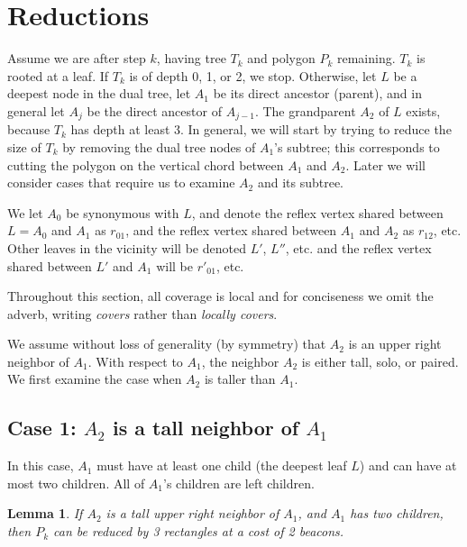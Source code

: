 \documentclass{article}
\newtheorem{lemma}{Lemma}
\begin{document}
\section{Reductions}\label{sec:reductions}

	Assume we are after step $k$, having tree $T_k$ and polygon $P_k$ remaining.
	$T_k$ is rooted at a leaf.
	If $T_k$ is of depth 0, 1, or 2, we stop.
	Otherwise, let $L$ be a deepest node in the dual
	tree, let $A_1$ be its direct ancestor (parent),
	and in general let $A_j$ be the direct ancestor of $A_{j-1}$.
	The grandparent $A_2$ of $L$ exists,
	because $T_k$ has depth at least 3.
	In general, we will start by trying to reduce the size of $T_k$
	by removing the dual tree nodes of $A_1$'s subtree;
	this corresponds to cutting the polygon on the vertical chord
	between $A_1$ and $A_2$.  Later we will consider cases that require
	us to examine $A_2$ and its subtree.
			
	We let $A_0$ be synonymous with $L$, and denote the reflex vertex shared between
	$L = A_0$ and $A_1$ as $r_{01}$, and the reflex vertex shared between
	$A_1$ and $A_2$ as $r_{12}$, etc.  
	Other leaves in the vicinity will be denoted $L'$, $L''$, etc.
	and the reflex vertex shared between $L'$ and $A_1$ will be $r'_{01}$, etc.
			
	Throughout this section, all coverage is local and for conciseness we omit the
	adverb, writing \emph{covers} rather than \emph{locally covers}. 
	
	We assume without loss of generality (by symmetry)
	that $A_2$ is an upper right neighbor of $A_1$.  
	With respect to $A_1$, the neighbor $A_2$ is either tall, solo, or paired.
	We first examine the case when $A_2$ is taller than $A_1$.

	\subsection{Case 1: $A_2$ is a tall neighbor of $A_1$}\label{sec:atwotall}
	
		In this case, $A_1$ must have at least one child (the deepest leaf $L$) and can
		have at most two children.  All of $A_1$'s children are left children.

		\begin{lemma}\label{lem:twotalltwokids}
			If $A_2$ is a tall upper right neighbor of $A_1$, 
			and $A_1$ has two children,
			then $P_k$ can be reduced
			by 3 rectangles at a cost of 2 beacons.
		\end{lemma}
		
\end{document}
